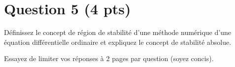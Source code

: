 \solution{
}

\section*{Question 5 (4 pts)}
Définissez le concept de région de stabilité d'une méthode numérique
d'une équation différentielle ordinaire et expliquez le concept de
stabilité absolue.

\solution{
}

Essayez de limiter vos réponses à 2 pages par question (soyez concis).


